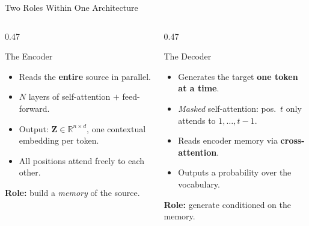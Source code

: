 \documentclass[aspectratio=169]{beamer}
\begin{document}
\begin{frame}{Two Roles Within One Architecture}
\vspace{-1mm}
\begin{columns}[T]
  \begin{column}{0.47\textwidth}
    \begin{block}{The Encoder}
      \begin{itemize}\setlength\itemsep{0pt}\small
        \item Reads the \textbf{entire} source in parallel.
        \item $N$ layers of self-attention $+$ feed-forward.
        \item Output: $\mathbf{Z}\in\mathbb{R}^{n\times d}$, one
              contextual embedding per token.
        \item All positions attend freely to each other.
      \end{itemize}
      \vspace{2pt}\small\textbf{Role:} build a \emph{memory} of the source.
    \end{block}
  \end{column}

  \begin{column}{0.47\textwidth}
    \begin{block}{The Decoder}
      \begin{itemize}\setlength\itemsep{0pt}\small
        \item Generates the target \textbf{one token at a time}.
        \item \emph{Masked} self-attention: pos.\ $t$ only attends
              to $1,\ldots,t{-}1$.
        \item Reads encoder memory via \textbf{cross-attention}.
        \item Outputs a probability over the vocabulary.
      \end{itemize}
      \vspace{2pt}\small\textbf{Role:} generate conditioned on the memory.
    \end{block}
  \end{column}
\end{columns}


\end{frame}
\end{document}
